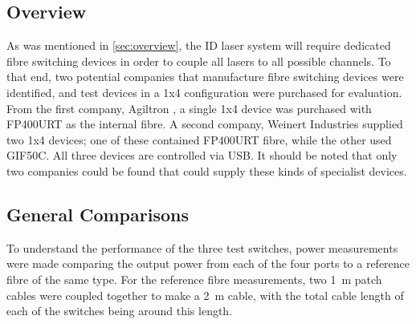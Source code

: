 \documentclass[a4paper,11pt]{article}
\begin{document}
\subsection{Overview}
As was mentioned in \cref{sec:overview}, the ID laser system will require dedicated fibre switching devices in order to couple all lasers to all possible channels. To that end, two potential companies that manufacture fibre switching devices were identified, and test devices in a 1x4 configuration were purchased for evaluation. From the first company, Agiltron \cite{bib:agiltron}, a single 1x4 device was purchased with FP400URT as the internal fibre. A second company, Weinert Industries \cite{bib:weinert} supplied two 1x4 devices; one of these contained FP400URT fibre, while the other used GIF50C. All three devices are controlled via USB. It should be noted that only two companies could be found that could supply these kinds of specialist devices.

\subsection{General Comparisons}

To understand the performance of the three test switches, power measurements were made comparing the output power from each of the four ports to a reference fibre of the same type. For the reference fibre measurements, two 1~m patch cables were coupled together to make a 2~m cable, with the total cable length of each of the switches being around this length.
\end{document}
